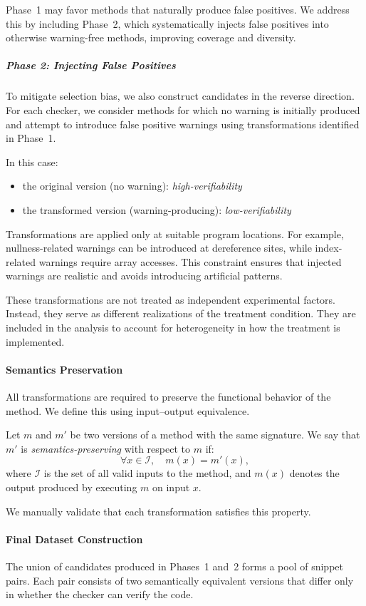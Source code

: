 Phase~1 may favor methods that naturally produce false positives. We address this by including Phase~2, which systematically injects false positives into otherwise warning-free methods, improving coverage and diversity.

\subparagraph{Phase 2: Injecting False Positives}
To mitigate selection bias, we also construct candidates in the reverse direction. For each checker, we consider methods for which no warning is initially produced and attempt to introduce false positive warnings using transformations identified in Phase~1.

In this case:
\begin{itemize}
    \item the original version (no warning): \emph{high-verifiability}
    \item the transformed version (warning-producing): \emph{low-verifiability}
\end{itemize}

Transformations are applied only at suitable program locations. For example, nullness-related warnings can be introduced at dereference sites, while index-related warnings require array accesses. This constraint ensures that injected warnings are realistic and avoids introducing artificial patterns.

These transformations are not treated as independent experimental factors. Instead, they serve as different realizations of the treatment condition. They are included in the analysis to account for heterogeneity in how the treatment is implemented.

\paragraph{Semantics Preservation}
All transformations are required to preserve the functional behavior of the method. We define this using input--output equivalence.

Let $m$ and $m'$ be two versions of a method with the same signature. We say that $m'$ is \emph{semantics-preserving} with respect to $m$ if:
\[
\forall x \in \mathcal{I}, \quad m(x) = m'(x),
\]
where $\mathcal{I}$ is the set of all valid inputs to the method, and $m(x)$ denotes the output produced by executing $m$ on input $x$.

We manually validate that each transformation satisfies this property.

\paragraph{Final Dataset Construction}
The union of candidates produced in Phases~1 and~2 forms a pool of snippet pairs. Each pair consists of two semantically equivalent versions that differ only in whether the checker can verify the code.

